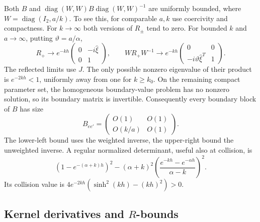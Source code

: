 \documentclass[11pt]{article}
\numberwithin{equation}{section}
\theoremstyle{remark}
\newcommand{\diag}{\operatorname{diag}}
\begin{document}
Both $B$ and $\diag(W,W)B\diag(W,W)^{-1}$ are uniformly bounded,
where $W=\diag(I_2,a/k)$. To see this, for comparable $a,k$ use
coercivity and compactness. For $k\to\infty$ both versions of $R_\pm$
tend to zero. For bounded $k$ and $a\to\infty$, putting $\vartheta=a/\alpha$,
\[
 R_+\to e^{-kh}\begin{pmatrix}0&-i\widehat\xi\\0&1\end{pmatrix},
 \qquad WR_+W^{-1}\to e^{-kh}
 \begin{pmatrix}0&0\\-i\vartheta\widehat\xi^T&1\end{pmatrix}.
\]
The reflected limits use $J$. The only possible nonzero eigenvalue
of their product is $e^{-2kh}<1$, uniformly away from one for
$k\geq k_0$. On the remaining compact parameter set, the homogeneous
boundary-value problem has no nonzero solution, so its boundary
matrix is invertible. Consequently every boundary block of $B$ has size
\begin{equation}\label{eq:B-block}
 B_{ee'}=\begin{pmatrix}O(1)&O(1)\\O(k/a)&O(1)\end{pmatrix}.
\end{equation}
The lower-left bound uses the weighted inverse, the upper-right bound
the unweighted inverse. A regular normalized determinant, useful also
at collision, is
\[
 (1-e^{-(\alpha+k)h})^2-(\alpha+k)^2
 \left(\frac{e^{-kh}-e^{-\alpha h}}{\alpha-k}\right)^2.
\]
Its collision value is $4e^{-2kh}(\sinh^2(kh)-(kh)^2)>0$.

\subsection{Kernel derivatives and \texorpdfstring{$R$}{R}-bounds}\label{sec:kernels}
\end{document}
